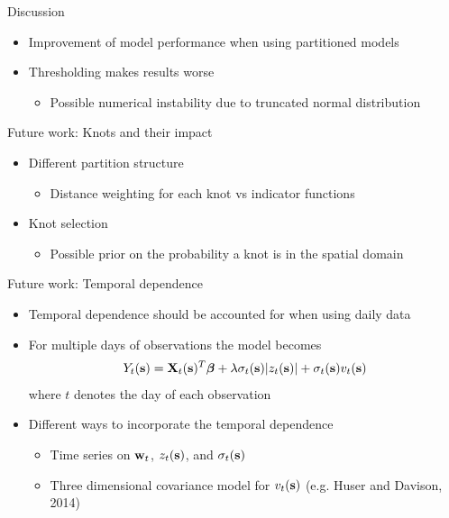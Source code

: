 \documentclass{beamer}
\begin{document}
\begin{frame}{Discussion}
  \begin{itemize} \setlength{\itemsep}{1em}
    \item Improvement of model performance when using partitioned models
    \item Thresholding makes results worse \vspace{0.5em}
    \begin{itemize} \setlength{\itemsep}{0.5em}
      \item Possible numerical instability due to truncated normal distribution
    \end{itemize}
  \end{itemize}
\end{frame}

\begin{frame}{Future work: Knots and their impact}
  \begin{itemize} \setlength{\itemsep}{1em}
    \item Different partition structure \vspace{0.5em}
    \begin{itemize} \setlength{\itemsep}{0.5em}
      \item Distance weighting for each knot vs indicator functions
    \end{itemize}
    \item Knot selection \vspace{0.5em}
    \begin{itemize} \setlength{\itemsep}{0.5em}
      \item Possible prior on the probability a knot is in the spatial domain
    \end{itemize}
  \end{itemize}
\end{frame}

\begin{frame}{Future work: Temporal dependence}
  \begin{itemize} \setlength{\itemsep}{1em}
    \item Temporal dependence should be accounted for when using daily data
    \item For multiple days of observations the model becomes
      \begin{align*}
        Y_t(\mbox{\bf s}) = \mbox{\bf X}_t(\mbox{\bf s})^T \mbox{\boldmath $\beta$} + \lambda \sigma_t(\mbox{\bf s}) | z_t(\mbox{\bf s}) | + \sigma_t(\mbox{\bf s}) v_t(\mbox{\bf s})
      \end{align*}
      where $t$ denotes the day of each observation
    \item Different ways to incorporate the temporal dependence \vspace{0.5em}
    \begin{itemize} \setlength{\itemsep}{0.5em}
      \item Time series on $\mbox{\bf w}_t$, $z_t(\mbox{\bf s})$, and $\sigma_t(\mbox{\bf s})$
      \item Three dimensional covariance model for $v_t(\mbox{\bf s})$ (e.g. Huser and Davison, 2014)
    \end{itemize}
  \end{itemize}
\end{frame}
\end{document}
